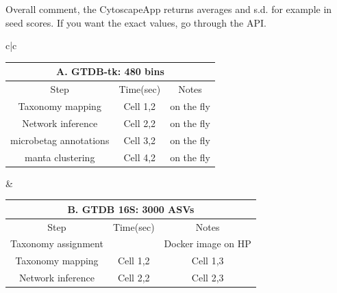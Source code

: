 \documentclass[sn-mathphys,Numbered, lineno]{sn-jnl}  %
\theoremstyle{thmstyleone}%
\theoremstyle{thmstyletwo}%
\theoremstyle{thmstylethree}%
\begin{document}
        Overall comment, the CytoscapeApp returns averages and s.d. for example in seed scores. 
        If you want the exact values, go through the API. 

        \begin{table}[ht]

            \centering

            \begin{adjustbox}{width=1.3\textwidth,center=\textwidth}

            \begin{tabular}{c|c}

                \begin{tabular}{ccc}

                    \multicolumn{3}{c}{A. GTDB-tk: 480 bins} \\
                    \toprule
                    Step &  Time(sec) & Notes \\
                    \toprule

                    Taxonomy mapping & Cell 1,2 & on the fly \\

                    Network inference & Cell 2,2 & on the fly  \\

                    microbetag annotations & Cell 3,2 & on the fly \\

                    manta clustering & Cell 4,2 & on the fly \\

                \end{tabular} &

                \begin{tabular}{ccc}

                    \multicolumn{3}{c}{B. GTDB 16S: 3000 ASVs} \\
                    \toprule
                    Step &  Time(sec) & Notes \\
                    \toprule

                    Taxonomy assignment &  & Docker image on HP\protect\footnotemark \\

                    Taxonomy mapping & Cell 1,2 & Cell 1,3 \\

                    Network inference & Cell 2,2 & Cell 2,3 \\


\end{tabular}
\end{tabular}
\end{adjustbox}
\end{table}
\end{document}
